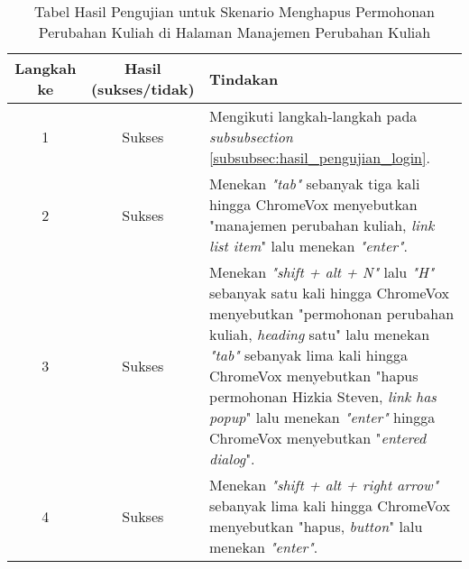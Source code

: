 \begin{table}[H]
    \centering 
    \caption{Tabel Hasil Pengujian untuk Skenario Menghapus Permohonan Perubahan Kuliah di Halaman Manajemen Perubahan Kuliah}
    \label{tab:hasil_pengujian_menghapus_permohonan_perubahan_kuliah_di_halaman_manajemen_perubahan_kuliah}
    \begin{tabular}{|c|c|p{10cm}|}
        \toprule
        Langkah ke & Hasil (sukses/tidak) & Tindakan \\

        \midrule
        1 & Sukses & Mengikuti langkah-langkah pada \textit{subsubsection} \ref{subsubsec:hasil_pengujian_login}. \\
        2 & Sukses & Menekan \textit{"tab"} sebanyak tiga kali hingga ChromeVox menyebutkan "manajemen perubahan kuliah, \textit{link list item}" lalu menekan \textit{"enter"}. \\
        3 & Sukses & Menekan \textit{"shift + alt + N"} lalu \textit{"H"} sebanyak satu kali hingga ChromeVox menyebutkan "permohonan perubahan kuliah, \textit{heading} satu" lalu menekan \textit{"tab"} sebanyak lima kali hingga ChromeVox menyebutkan "hapus permohonan Hizkia Steven, \textit{link has popup}" lalu menekan \textit{"enter"} hingga ChromeVox menyebutkan "\textit{entered dialog}". \\
        4 & Sukses & Menekan \textit{"shift + alt + right arrow"} sebanyak lima kali hingga ChromeVox menyebutkan "hapus, \textit{button}" lalu menekan \textit{"enter"}. \\ 

        \bottomrule

    \end{tabular}
\end{table}
